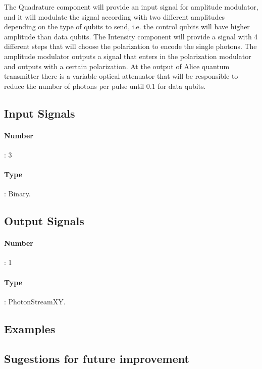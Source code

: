The Quadrature component will provide an input signal for amplitude modulator, and it will modulate the signal according with two different amplitudes depending on the type of qubits to send, i.e. the control qubits will have higher amplitude than data qubits. The Intensity component will provide a signal with 4 different steps that will choose the polarization to encode the single photons. The amplitude modulator outputs a signal that enters in the polarization modulator and outputs with a certain polarization. At the output of Alice quantum transmitter there is a variable optical attenuator that will be responsible to reduce the number of photons per pulse until 0.1 for data qubits.

\subsection*{Input Signals}
\paragraph*{Number}: 3
\paragraph*{Type}: Binary.

\subsection*{Output Signals}
\paragraph*{Number}: 1
\paragraph*{Type}: PhotonStreamXY.

\subsection*{Examples}


\subsection*{Sugestions for future improvement}



